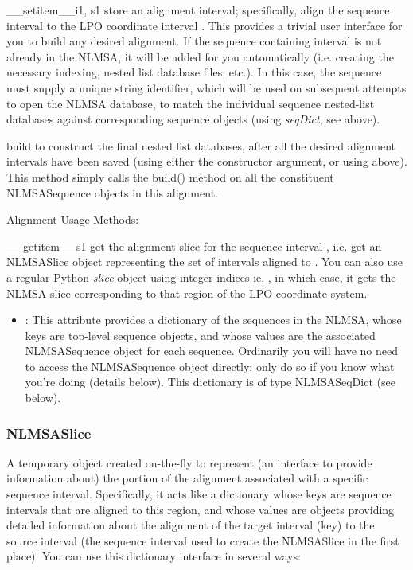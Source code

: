 \documentclass{howto}
\begin{document}
\begin{funcdesc}{__setitem__}{i1, s1}
  store an alignment interval; specifically, align the sequence
  interval  to the LPO coordinate interval .  This provides a trivial
  user interface for you to build any desired alignment.  If the sequence containing
  interval  is not already in the NLMSA, it will be added for you automatically
  (i.e. creating the necessary indexing, nested list database files, etc.).  In this
  case, the sequence must supply a unique string identifier, which will be used
  on subsequent attempts to open the NLMSA database, to match the individual sequence
  nested-list databases against corresponding sequence objects (using {\em seqDict},
  see above).
\end{funcdesc}


\begin{funcdesc}{build}{}
  to construct the final nested list databases,
  after all the desired alignment intervals have been saved (using either the
   constructor argument, or using  above).  This method
  simply calls the build() method on all the constituent NLMSASequence objects
  in this alignment.
\end{funcdesc}


Alignment Usage Methods:

\begin{funcdesc}{__getitem__}{s1}
  get the alignment slice for the sequence interval ,
  i.e. get an NLMSASlice object representing the set of intervals aligned to .
  You can also use a regular Python {\em slice} object using integer indices
  ie. , in which case, it gets the NLMSA slice corresponding to that 
  region of the LPO coordinate system.
\end{funcdesc}

\begin{itemize}
\item
{}: This attribute provides a dictionary of the sequences in
the NLMSA, whose keys are top-level sequence objects, and whose values are
the associated NLMSASequence object for each sequence.  Ordinarily you will have
no need to access the NLMSASequence object directly; only do so if you know what
you're doing (details below).  This dictionary is of type NLMSASeqDict (see below).

\end{itemize}

\subsubsection{NLMSASlice}
A temporary object created on-the-fly to represent (an interface to provide 
information about) the portion of the alignment associated with a specific
sequence interval.  Specifically, it acts like a dictionary whose keys are
sequence intervals that are aligned to this region, and whose values are
 objects providing detailed information about the alignment of
the target interval (key) to the source interval (the sequence interval
used to create the NLMSASlice in the first place).  You can use this
dictionary interface in several ways:
\end{document}
